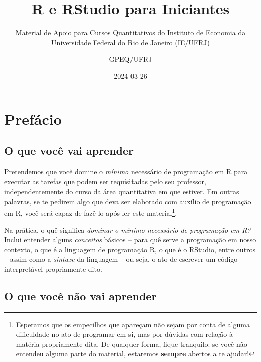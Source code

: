 \documentclass[
  letterpaper,
  DIV=11,
  numbers=noendperiod]{scrreprt}
\title{R e RStudio para Iniciantes}
\subtitle{Material de Apoio para Cursos Quantitativos do Instituto de
Economia da Universidade Federal do Rio de Janeiro (IE/UFRJ)}
\author{GPEQ/UFRJ}
\date{2024-03-26}
\renewcommand*\contentsname{Índice}
\newcommand\contentsname{Índice}
\begin{document}
\maketitle

\renewcommand*\contentsname{Índice}
{
\hypersetup{linkcolor=}
\setcounter{tocdepth}{2}
\tableofcontents
}

\chapter*{Prefácio}\label{sec-preface}


\section*{O que você vai aprender}\label{o-que-vocuxea-vai-aprender}


Pretendemos que você domine o \emph{mínimo} necessário de programação em
R para executar as tarefas que podem ser requisitadas pelo seu
professor, independentemente do curso da área quantitativa em que
estiver. Em outras palavras, se te pedirem algo que deva ser elaborado
com auxílio de programação em R, você será capaz de fazê-lo após ler
este material\footnote{Esperamos que os empecilhos que apareçam não
  sejam por conta de alguma dificuldade no ato de programar em si, mas
  por dúvidas com relação à matéria propriamente dita. De qualquer
  forma, fique tranquilo: se você não entendeu alguma parte do material,
  estaremos \textbf{sempre} abertos a te ajudar!}.

Na prática, o quê significa \emph{dominar o mínimo necessário de
programação em R?} Inclui entender alguns \emph{conceitos} básicos --
para quê serve a programação em nosso contexto, o que é a linguagem de
programação R, o que é o RStudio, entre outros -- assim como a
\emph{sintaxe} da linguagem -- ou seja, o ato de escrever um código
interpretável propriamente dito.

\section*{\texorpdfstring{O que você \textbf{não} vai
aprender}{O que você não vai aprender}}\label{o-que-vocuxea-nuxe3o-vai-aprender}
\end{document}
